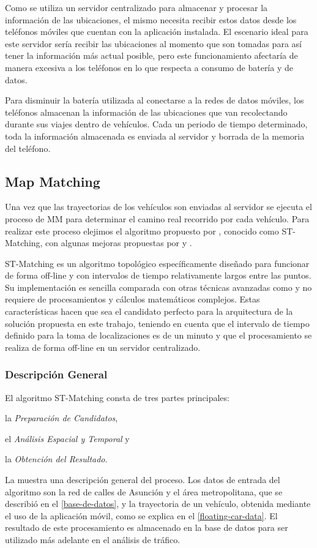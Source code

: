Como se utiliza un servidor centralizado para almacenar y procesar la información de las ubicaciones, el mismo necesita recibir estos datos desde los teléfonos móviles que cuentan con la aplicación instalada. El escenario ideal para este servidor sería recibir las ubicaciones al momento que son tomadas para así tener la información más actual posible, pero este funcionamiento afectaría de manera excesiva a los teléfonos en lo que respecta a consumo de batería y de datos.

Para disminuir la batería utilizada al conectarse a la redes de datos móviles, los teléfonos almacenan la información de las ubicaciones que van recolectando durante sus viajes dentro de vehículos. Cada un periodo de tiempo determinado, toda la información almacenada es enviada al servidor y borrada de la memoria del teléfono.

\subsection{Map Matching}

Una vez que las trayectorias de los vehículos son enviadas al servidor se ejecuta el proceso de MM para determinar el camino real recorrido por cada vehículo. Para realizar este proceso elejimos el algoritmo propuesto por \cite{lou2009map}, conocido como ST-Matching, con algunas mejoras propuestas por \cite{budigm2012algorithm} y \cite{sakic2012map}. 

ST-Matching es un algoritmo topológico específicamente diseñado para funcionar de forma off-line y con intervalos de tiempo relativamente largos entre las puntos. Su implementación es sencilla comparada con otras técnicas avanzadas como \cite{quddus2006high, newson2009hidden} y no requiere de procesamientos y cálculos matemáticos complejos. Estas características hacen que sea el candidato perfecto para la arquitectura de la solución propuesta en este trabajo, teniendo en cuenta que el intervalo de tiempo definido para la toma de localizaciones es de un minuto y que el procesamiento se realiza de forma off-line en un servidor centralizado. 

\subsubsection{Descripción General}

El algoritmo ST-Matching consta de tres partes principales: \begin{enumerate*}[a)]
\item la \emph{Preparación de Candidatos},
\item el \emph{Análisis Espacial y Temporal} y
\item la \emph{Obtención del Resultado}.
\end{enumerate*}
La  muestra una descripción general del proceso. Los datos de entrada del algoritmo son la red de calles de Asunción y el área metropolitana, que se describió en el \cref{base-de-datos}, y la trayectoria de un vehículo, obtenida mediante el uso de la aplicación móvil, como se explica en el \cref{floating-car-data}. El resultado de este procesamiento es almacenado en la base de datos para ser utilizado más adelante en el análisis de tráfico.

